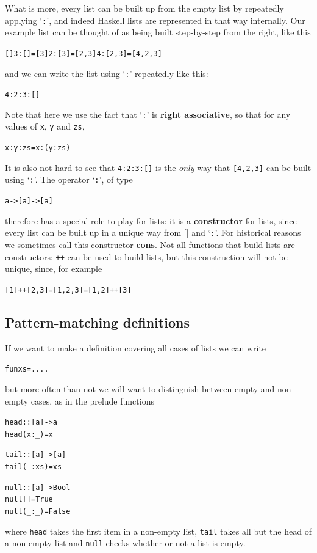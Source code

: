 What is more, every list can be built up from the
empty list by repeatedly applying `\texttt{:}', and indeed Haskell lists
are represented in that way internally. Our example list can be thought
of as being built step-by-step from the right, like this
\begin{alltt}
[]      3:[] = [3]      2:[3] = [2,3]      4:[2,3] = [4,2,3]
\end{alltt}
and we can write the list using `\texttt{:}' repeatedly like this:
\begin{alltt}
4:2:3:[]
\end{alltt}
Note that here we use the fact that `\texttt{:}' is \textbf{right associative}, 
so that for any values of \texttt{x}, \texttt{y} and
\texttt{zs},
\begin{alltt}
x:y:zs = x:(y:zs)
\end{alltt}
It is also not hard to see that \texttt{4:2:3:[]} is the 
{\em only\/} way that \texttt{[4,2,3]}
can be built using `\texttt{:}'.
The operator `\texttt{:}', of type
\begin{alltt}
a -> [a] -> [a]
\end{alltt}
therefore has a special role to play for lists: it is a
\textbf{constructor} for
lists, since every list can be built up in a unique way from [] and
`\texttt{:}'. For historical reasons we sometimes call this constructor
\textbf{cons}. Not all functions that build lists are constructors:
\texttt{++} can be used to build lists, but this construction will not
be unique, since, for example
\begin{alltt}
[1] ++ [2,3] = [1,2,3] = [1,2] ++ [3]
\end{alltt}

\subsection*{Pattern-matching definitions}

If we want to make a definition covering all cases of lists we can write
\begin{alltt}
fun xs = ....
\end{alltt}
but more often than not we will want to distinguish between empty and
non-empty cases, as in the prelude functions
\begin{alltt}
head             :: [a] -> a
head (x:_)        = x

tail             :: [a] -> [a]
tail (_:xs)       = xs

null             :: [a] -> Bool
null []           = True
null (_:_)        = False
\end{alltt}
where \texttt{head} takes the first item in a non-empty list,
\texttt{tail} takes all but the head of a non-empty list and
\texttt{null} checks whether or not a list is empty. 

